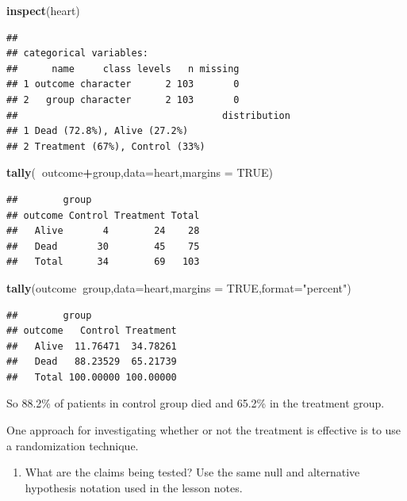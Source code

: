 \documentclass[
]{book}
\newenvironment{Shaded}{\begin{snugshade}}{\end{snugshade}}
\newcommand{\DataTypeTok}[1]{\textcolor[rgb]{0.13,0.29,0.53}{#1}}
\newcommand{\KeywordTok}[1]{\textcolor[rgb]{0.13,0.29,0.53}{\textbf{#1}}}
\newcommand{\NormalTok}[1]{#1}
\newcommand{\OperatorTok}[1]{\textcolor[rgb]{0.81,0.36,0.00}{\textbf{#1}}}
\newcommand{\OtherTok}[1]{\textcolor[rgb]{0.56,0.35,0.01}{#1}}
\newcommand{\StringTok}[1]{\textcolor[rgb]{0.31,0.60,0.02}{#1}}
\providecommand{\tightlist}{%
  \setlength{\itemsep}{0pt}\setlength{\parskip}{0pt}}
\begin{document}
\begin{Shaded}
\begin{Highlighting}[]
\KeywordTok{inspect}\NormalTok{(heart)}
\end{Highlighting}
\end{Shaded}

\begin{verbatim}
## 
## categorical variables:  
##      name     class levels   n missing
## 1 outcome character      2 103       0
## 2   group character      2 103       0
##                                    distribution
## 1 Dead (72.8%), Alive (27.2%)                  
## 2 Treatment (67%), Control (33%)
\end{verbatim}

\begin{Shaded}
\begin{Highlighting}[]
\KeywordTok{tally}\NormalTok{(}\OperatorTok{~}\NormalTok{outcome}\OperatorTok{+}\NormalTok{group,}\DataTypeTok{data=}\NormalTok{heart,}\DataTypeTok{margins =} \OtherTok{TRUE}\NormalTok{)}
\end{Highlighting}
\end{Shaded}

\begin{verbatim}
##        group
## outcome Control Treatment Total
##   Alive       4        24    28
##   Dead       30        45    75
##   Total      34        69   103
\end{verbatim}

\begin{Shaded}
\begin{Highlighting}[]
\KeywordTok{tally}\NormalTok{(outcome}\OperatorTok{~}\NormalTok{group,}\DataTypeTok{data=}\NormalTok{heart,}\DataTypeTok{margins =} \OtherTok{TRUE}\NormalTok{,}\DataTypeTok{format=}\StringTok{"percent"}\NormalTok{)}
\end{Highlighting}
\end{Shaded}

\begin{verbatim}
##        group
## outcome   Control Treatment
##   Alive  11.76471  34.78261
##   Dead   88.23529  65.21739
##   Total 100.00000 100.00000
\end{verbatim}

So 88.2\% of patients in control group died and 65.2\% in the treatment group.

One approach for investigating whether or not the treatment is effective is to use a randomization technique.

\begin{enumerate}
\def\labelenumi{\alph{enumi}.}
\setcounter{enumi}{1}
\tightlist
\item
  What are the claims being tested? Use the same null and alternative hypothesis notation used in the lesson notes.
\end{enumerate}
\end{document}
